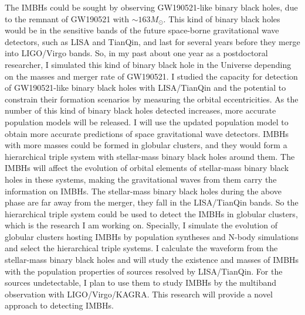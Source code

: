 \documentclass[12pt,a4paper,sans]{article}%
\begin{document}
The IMBHs could be sought by observing GW190521-like binary black holes, due to the
remnant of GW190521 with $\sim163M_{\odot}$. This kind of binary black holes would be in the sensitive bands of the
future space-borne gravitational wave detectors, such as LISA and TianQin, and last for several years before they
merge into LIGO/Virgo bands. So, in my past about one year as a postdoctoral researcher, I simulated this kind of binary
black hole in the Universe depending on the masses and merger rate of GW190521. I studied the capacity for detection of GW190521-like
binary black holes with LISA/TianQin and the potential to constrain their formation scenarios by measuring the orbital
eccentricities. As the number of this kind of binary black holes detected increases, more accurate population models will
be released. I will use the updated population model to obtain more accurate predictions of space gravitational wave
detectors. IMBHs with more masses could be formed in globular
clusters, and they would form a hierarchical triple system with stellar-mass binary black holes around them. The IMBHs
will affect the evolution of orbital elements of stellar-mass binary black holes in these systems, making the
gravitational waves from them carry the information on IMBHs. The stellar-mass binary black holes during the above phase
are far away from the merger, they fall in the LISA/TianQin bands. So the hierarchical triple system could be used to
detect the IMBHs in globular clusters, which is the research I am working on. Specially, I simulate the evolution of
globular clusters hosting IMBHs by population syntheses and N-body simulations and select the hierarchical triple
systems. I calculate the waveform from the stellar-mass binary black holes and will study the existence and masses of
IMBHs with the population properties of sources resolved by LISA/TianQin. For the sources undetectable, I plan to use
them to study IMBHs by the multiband observation with LIGO/Virgo/KAGRA. This research will provide a novel approach to
detecting IMBHs.
\end{document}
